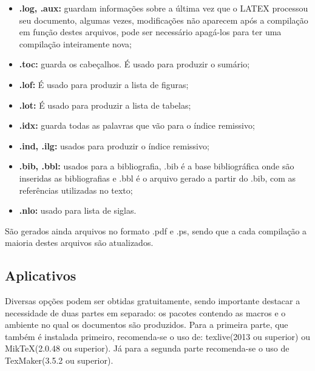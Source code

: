 \begin{itemize}

\item \textbf{.log, .aux:} guardam informações sobre a última vez que o LATEX processou seu documento, algumas vezes, modificações não aparecem após a compilação em função destes arquivos, pode ser necessário apagá-los para ter uma compilação inteiramente nova;

\item \textbf{.toc:} guarda os cabeçalhos. É usado para produzir o sumário;

\item \textbf{.lof:} É usado para produzir a lista de figuras;

\item \textbf{.lot:} É usado para produzir a lista de tabelas;

\item \textbf{.idx:} guarda todas as palavras que vão para o índice remissivo;

\item \textbf{.ind, .ilg:} usados para produzir o índice remissivo;

\item \textbf{.bib, .bbl:} usados para a bibliografia, .bib é a base bibliográfica onde são inseridas as bibliografias e .bbl é o arquivo gerado a partir do .bib, com as referências utilizadas no texto;

\item \textbf{.nlo:} usado para lista de siglas.

\end{itemize}

São gerados ainda arquivos no formato .pdf e .ps, sendo que a cada compilação a maioria destes arquivos são atualizados. 


\subsection{Aplicativos}

Diversas opções podem ser obtidas gratuitamente, sendo importante destacar a necessidade de duas partes em separado: os pacotes contendo as macros e o ambiente no qual os documentos são produzidos. 
Para a primeira parte, que também é instalada primeiro, recomenda-se o uso de: texlive(2013 ou superior) ou MikTeX(2.0.48 ou superior). Já para a segunda parte recomenda-se o uso de TexMaker(3.5.2 ou superior).

